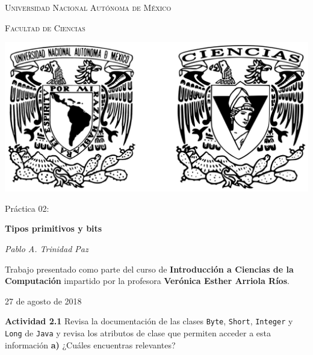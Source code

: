 \documentclass[11pt,letterpaper]{article}
\begin{document}
\begin{titlepage}
    \centering

    {\scshape\LARGE Universidad Nacional Autónoma de México \par}

    \vspace{1cm}
    {\scshape\Large Facultad de Ciencias\par}
    \vspace{1.5cm}

    \begin{center}
        \includegraphics[scale=.1]{../../assets/img/logo.png}
    \end{center}

    \vspace{.8 cm}

    {\LARGE Práctica 02: \par}
    {\huge\bfseries Tipos primitivos y bits \par}

    \vspace{0.5cm}
    {\large\itshape Pablo A. Trinidad Paz\par}

    \vfill

    Trabajo presentado como parte del curso de \textbf{Introducción a Ciencias de la Computación}
    impartido por la profesora \textbf{Verónica Esther Arriola Ríos}. \par
    \vspace{0.1cm}
    {\large 27 de agosto de 2018\par}
\end{titlepage}

\textbf{Actividad 2.1} Revisa la documentación de las clases \texttt{Byte},
\texttt{Short}, \texttt{Integer} y \texttt{Long} de \texttt{Java} y revisa
los atributos de clase que permiten acceder a esta información
\textbf{a)} ¿Cuáles encuentras relevantes? \\
\end{document}

